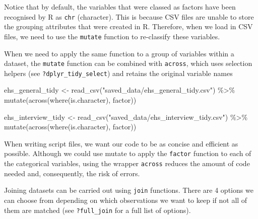 \documentclass[
  letterpaper,
  DIV=11,
  numbers=noendperiod]{scrreprt}
\newenvironment{Shaded}{\begin{snugshade}}{\end{snugshade}}
\newcommand{\FunctionTok}[1]{\textcolor[rgb]{0.28,0.35,0.67}{#1}}
\newcommand{\NormalTok}[1]{\textcolor[rgb]{0.00,0.23,0.31}{#1}}
\newcommand{\OtherTok}[1]{\textcolor[rgb]{0.00,0.23,0.31}{#1}}
\newcommand{\SpecialCharTok}[1]{\textcolor[rgb]{0.37,0.37,0.37}{#1}}
\newcommand{\StringTok}[1]{\textcolor[rgb]{0.13,0.47,0.30}{#1}}
\begin{document}
Notice that by default, the variables that were classed as factors have
been recognised by R as \texttt{chr} (character). This is because CSV
files are unable to store the grouping attributes that were created in
R. Therefore, when we load in CSV files, we need to use the
\texttt{mutate} function to re-classify these variables.

When we need to apply the same function to a group of variables within a
dataset, the \texttt{mutate} function can be combined with
\texttt{across}, which uses selection helpers (see
\texttt{?dplyr\_tidy\_select}) and retains the original variable names

\begin{Shaded}
\begin{Highlighting}[]
\NormalTok{ehs\_general\_tidy }\OtherTok{\textless{}{-}} \FunctionTok{read\_csv}\NormalTok{(}\StringTok{"saved\_data/ehs\_general\_tidy.csv"}\NormalTok{) }\SpecialCharTok{\%\textgreater{}\%} 
  \FunctionTok{mutate}\NormalTok{(}\FunctionTok{across}\NormalTok{(}\FunctionTok{where}\NormalTok{(is.character), factor))}


\NormalTok{ehs\_interview\_tidy }\OtherTok{\textless{}{-}} \FunctionTok{read\_csv}\NormalTok{(}\StringTok{"saved\_data/ehs\_interview\_tidy.csv"}\NormalTok{) }\SpecialCharTok{\%\textgreater{}\%} 
  \FunctionTok{mutate}\NormalTok{(}\FunctionTok{across}\NormalTok{(}\FunctionTok{where}\NormalTok{(is.character), factor))}
\end{Highlighting}
\end{Shaded}

\begin{tcolorbox}[enhanced jigsaw, bottomrule=.15mm, left=2mm, leftrule=.75mm, bottomtitle=1mm, coltitle=black, colbacktitle=quarto-callout-tip-color!10!white, toptitle=1mm, arc=.35mm, breakable, title=\textcolor{quarto-callout-tip-color}{\faLightbulb}\hspace{0.5em}{Style tips}, rightrule=.15mm, toprule=.15mm, opacityback=0, opacitybacktitle=0.6, titlerule=0mm, colback=white, colframe=quarto-callout-tip-color-frame]

When writing script files, we want our code to be as concise and
efficient as possible. Although we could use mutate to apply the
\texttt{factor} function to each of the categorical variables, using the
wrapper \texttt{across} reduces the amount of code needed and,
consequently, the risk of errors.

\end{tcolorbox}

Joining datasets can be carried out using \texttt{join} functions. There
are 4 options we can choose from depending on which observations we want
to keep if not all of them are matched (see \texttt{?full\_join} for a
full list of options).
\end{document}
